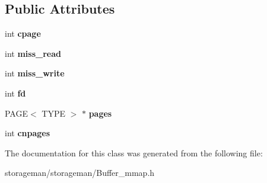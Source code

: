 \subsection*{Public Attributes}
\begin{DoxyCompactItemize}
\item 
\hypertarget{classmia_1_1sm_1_1_buffer__mmap_a4426c619759c9d3e9832c7a94b3b90b6}{int {\bfseries cpage}}\label{classmia_1_1sm_1_1_buffer__mmap_a4426c619759c9d3e9832c7a94b3b90b6}

\item 
\hypertarget{classmia_1_1sm_1_1_buffer__mmap_ad9e564fdacc8dece3dd99bb75aabc075}{int {\bfseries miss\-\_\-read}}\label{classmia_1_1sm_1_1_buffer__mmap_ad9e564fdacc8dece3dd99bb75aabc075}

\item 
\hypertarget{classmia_1_1sm_1_1_buffer__mmap_a420fcbd775fe889c4a3cdbdf12543374}{int {\bfseries miss\-\_\-write}}\label{classmia_1_1sm_1_1_buffer__mmap_a420fcbd775fe889c4a3cdbdf12543374}

\item 
\hypertarget{classmia_1_1sm_1_1_buffer__mmap_aec47baf6260d505617de2d405a97a788}{int {\bfseries fd}}\label{classmia_1_1sm_1_1_buffer__mmap_aec47baf6260d505617de2d405a97a788}

\item 
\hypertarget{classmia_1_1sm_1_1_buffer__mmap_ab49e61b9044b8c91f4cc393d70311652}{P\-A\-G\-E$<$ T\-Y\-P\-E $>$ $\ast$ {\bfseries pages}}\label{classmia_1_1sm_1_1_buffer__mmap_ab49e61b9044b8c91f4cc393d70311652}

\item 
\hypertarget{classmia_1_1sm_1_1_buffer__mmap_a1208ae10b48ad3d5746787bd1d34a424}{int {\bfseries cnpages}}\label{classmia_1_1sm_1_1_buffer__mmap_a1208ae10b48ad3d5746787bd1d34a424}

\end{DoxyCompactItemize}


The documentation for this class was generated from the following file\-:\begin{DoxyCompactItemize}
\item 
storageman/storageman/Buffer\-\_\-mmap.\-h\end{DoxyCompactItemize}
